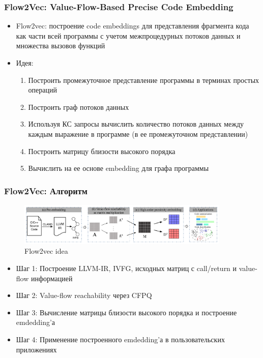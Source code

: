 \documentclass[xcolor=table,english]{beamer}
\begin{document}
\begin{frame}[fragile] \frametitle{Flow2Vec: Value-Flow-Based Precise Code Embedding}
    \begin{itemize}
            \item Flow2vec: построение code embeddings для представления фрагмента кода как части всей программы с учетом межпроцедурных потоков данных и множества вызовов функций
            \item Идея:
            {
                \begin{enumerate}
                    \item Построить промежуточное представление программы в терминах простых операций
                    \item Построить граф потоков данных
                    \item Используя КС запросы вычислить количество потоков данных между каждым выражение в программе (в ее промежуточном представлении)
                    \item Построить матрицу близости высокого порядка
                    \item Вычислить на ее основе embedding для графа программы
                \end{enumerate}
            }
        \end{itemize}
\end{frame}

\begin{frame}[fragile] \frametitle{Flow2Vec: Алгоритм}
    \begin{minipage}[m]{\linewidth}
        \begin{figure}
            \centering
            \includegraphics[width=0.9\textwidth]{figures/flow2vec_idea.png}
            \caption{Flow2vec idea}
            \label{fig:flow2vec_idea}
        \end{figure}
    \end{minipage}\hfill
    \begin{minipage}[m]{\linewidth}
        \begin{itemize}
            \item Шаг 1: Построение LLVM-IR, IVFG, исходных матриц с call/return и value-flow информацией
            \item Шаг 2: Value-flow reachability через CFPQ
            \item Шаг 3: Вычисление матрицы близости высокого порядка и построение emdedding'а
            \item Шаг 4: Применение построенного emdedding'а в пользовательских приложениях
        \end{itemize}
    \end{minipage}
\end{frame}
\end{document}
